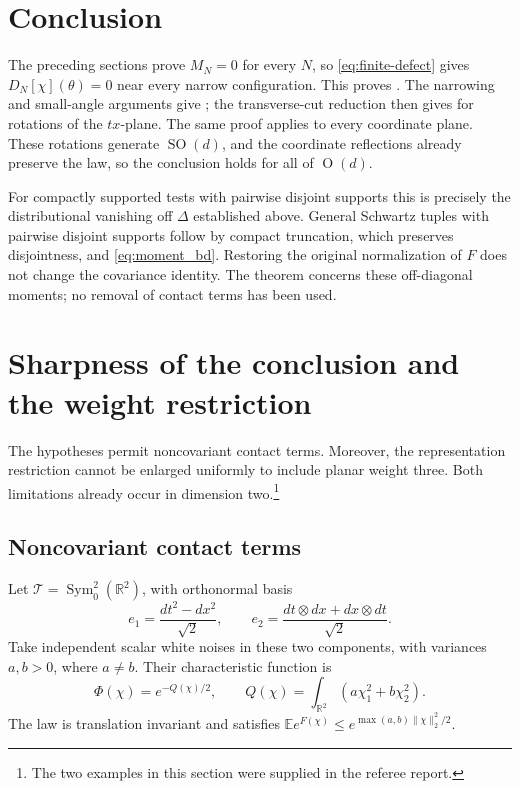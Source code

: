 \documentclass[11pt, letterpaper, reqno]{amsart}
\theoremstyle{definition}
\theoremstyle{remark}
\newcommand{\bbE}{\mathbb{E}}
\newcommand{\bbR}{\mathbb{R}}
\newcommand{\calT}{\mathcal{T}}
\begin{document}
\section{Conclusion}

The preceding sections prove $M_N=0$ for every $N$, so
\eqref{eq:finite-defect} gives $D_N[\chi](\theta)=0$ near every narrow
configuration. This proves . The narrowing and small-angle
arguments give ; the transverse-cut reduction then
gives  for rotations of the $tx$-plane.
The same proof applies to every coordinate plane. These rotations
generate $\operatorname{SO}(d)$, and the coordinate reflections
already preserve the law, so the conclusion holds for all of
$\operatorname{O}(d)$.

For compactly supported tests with pairwise disjoint supports this
is precisely the distributional vanishing off $\Delta$ established
above. General Schwartz tuples with pairwise disjoint supports
follow by compact truncation, which preserves disjointness, and
\eqref{eq:moment_bd}. Restoring the original normalization of $F$
does not change the covariance identity. The theorem concerns these
off-diagonal moments; no removal of contact terms has been used.


\section{Sharpness of the conclusion and the weight restriction}
\label{sec:sharpness-examples}
\enlargethispage{2pt}

The hypotheses permit noncovariant contact terms. Moreover, the
representation restriction cannot be enlarged uniformly to include
planar weight three. Both limitations already occur in dimension two.\footnote{The two
examples in this section were supplied in the referee report.}

\subsection{Noncovariant contact terms}

Let $\calT=\operatorname{Sym}^2_0(\bbR^2)$, with orthonormal basis
\[
 e_1=\frac{dt^2-dx^2}{\sqrt2},\qquad
 e_2=\frac{dt\otimes dx+dx\otimes dt}{\sqrt2}.
\]
Take independent scalar white noises in these two components, with
variances $a,b>0$, where $a\ne b$. Their characteristic function is
\[
 \Phi(\chi)=e^{-Q(\chi)/2},\qquad
 Q(\chi)=\int_{\bbR^2}(a\chi_1^2+b\chi_2^2).
\]
The law is translation invariant and satisfies
$\bbE e^{F(\chi)}\leq e^{\max(a,b)\|\chi\|_2^2/2}$.
\end{document}
